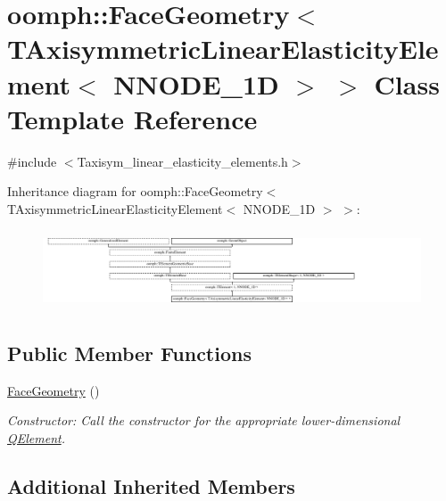 \hypertarget{classoomph_1_1FaceGeometry_3_01TAxisymmetricLinearElasticityElement_3_01NNODE__1D_01_4_01_4}{}\section{oomph\+:\+:Face\+Geometry$<$ T\+Axisymmetric\+Linear\+Elasticity\+Element$<$ N\+N\+O\+D\+E\+\_\+1D $>$ $>$ Class Template Reference}
\label{classoomph_1_1FaceGeometry_3_01TAxisymmetricLinearElasticityElement_3_01NNODE__1D_01_4_01_4}


{\ttfamily \#include $<$Taxisym\+\_\+linear\+\_\+elasticity\+\_\+elements.\+h$>$}

Inheritance diagram for oomph\+:\+:Face\+Geometry$<$ T\+Axisymmetric\+Linear\+Elasticity\+Element$<$ N\+N\+O\+D\+E\+\_\+1D $>$ $>$\+:\begin{figure}[H]
\begin{center}
\leavevmode
\includegraphics[height=2.367865cm]{classoomph_1_1FaceGeometry_3_01TAxisymmetricLinearElasticityElement_3_01NNODE__1D_01_4_01_4}
\end{center}
\end{figure}
\subsection*{Public Member Functions}
\begin{DoxyCompactItemize}
\item 
\hyperlink{classoomph_1_1FaceGeometry_3_01TAxisymmetricLinearElasticityElement_3_01NNODE__1D_01_4_01_4_ae531d448e78de388d5bdccf251e94804}{Face\+Geometry} ()
\begin{DoxyCompactList}\small\item\em Constructor\+: Call the constructor for the appropriate lower-\/dimensional \hyperlink{classoomph_1_1QElement}{Q\+Element}. \end{DoxyCompactList}\end{DoxyCompactItemize}
\subsection*{Additional Inherited Members}


